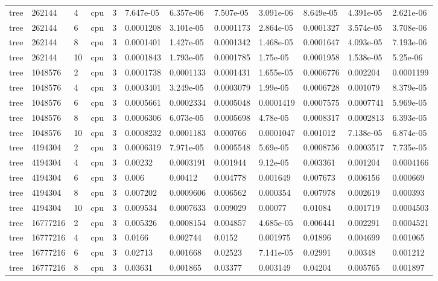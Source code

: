 \begin{tabular}{llllllllllll}
tree & 262144 & 4 & cpu & 3 & 7.647e-05 & 6.357e-06 & 7.507e-05 & 3.091e-06 & 8.649e-05 & 4.391e-05 & 2.621e-06 \\
tree & 262144 & 6 & cpu & 3 & 0.0001208 & 3.101e-05 & 0.0001173 & 2.864e-05 & 0.0001327 & 3.574e-05 & 3.708e-06 \\
tree & 262144 & 8 & cpu & 3 & 0.0001401 & 1.427e-05 & 0.0001342 & 1.468e-05 & 0.0001647 & 4.093e-05 & 7.193e-06 \\
tree & 262144 & 10 & cpu & 3 & 0.0001843 & 1.793e-05 & 0.0001785 & 1.75e-05 & 0.0001958 & 1.538e-05 & 5.25e-06 \\
tree & 1048576 & 2 & cpu & 3 & 0.0001738 & 0.0001133 & 0.0001431 & 1.655e-05 & 0.0006776 & 0.002204 & 0.0001199 \\
tree & 1048576 & 4 & cpu & 3 & 0.0003401 & 3.249e-05 & 0.0003079 & 1.99e-05 & 0.0006728 & 0.001079 & 8.379e-05 \\
tree & 1048576 & 6 & cpu & 3 & 0.0005661 & 0.0002334 & 0.0005048 & 0.0001419 & 0.0007575 & 0.0007741 & 5.969e-05 \\
tree & 1048576 & 8 & cpu & 3 & 0.0006306 & 6.073e-05 & 0.0005698 & 4.78e-05 & 0.0008317 & 0.0002813 & 6.393e-05 \\
tree & 1048576 & 10 & cpu & 3 & 0.0008232 & 0.0001183 & 0.000766 & 0.0001047 & 0.001012 & 7.138e-05 & 6.874e-05 \\
tree & 4194304 & 2 & cpu & 3 & 0.0006319 & 7.971e-05 & 0.0005548 & 5.69e-05 & 0.0008756 & 0.0003517 & 7.735e-05 \\
tree & 4194304 & 4 & cpu & 3 & 0.00232 & 0.0003191 & 0.001944 & 9.12e-05 & 0.003361 & 0.001204 & 0.0004166 \\
tree & 4194304 & 6 & cpu & 3 & 0.006 & 0.00412 & 0.004778 & 0.001649 & 0.007673 & 0.006156 & 0.000669 \\
tree & 4194304 & 8 & cpu & 3 & 0.007202 & 0.0009606 & 0.006562 & 0.000354 & 0.007978 & 0.002619 & 0.000393 \\
tree & 4194304 & 10 & cpu & 3 & 0.009534 & 0.0007633 & 0.009029 & 0.00077 & 0.01084 & 0.001719 & 0.0004503 \\
tree & 16777216 & 2 & cpu & 3 & 0.005326 & 0.0008154 & 0.004857 & 4.685e-05 & 0.006441 & 0.002291 & 0.0004521 \\
tree & 16777216 & 4 & cpu & 3 & 0.0166 & 0.002744 & 0.0152 & 0.001975 & 0.01896 & 0.004699 & 0.001065 \\
tree & 16777216 & 6 & cpu & 3 & 0.02713 & 0.001668 & 0.02523 & 7.141e-05 & 0.02991 & 0.00348 & 0.001212 \\
tree & 16777216 & 8 & cpu & 3 & 0.03631 & 0.001865 & 0.03377 & 0.003149 & 0.04204 & 0.005765 & 0.001897 \\

\end{tabular}
